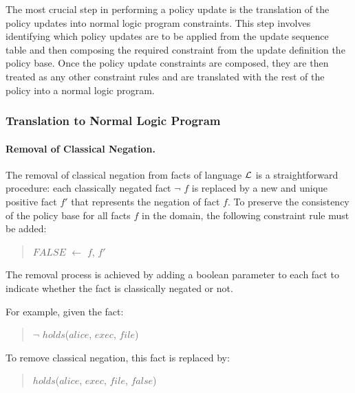\documentclass[10pt, twocolumn]{article}
\begin{document}
        The most crucial step in performing a policy update is the translation
        of the policy updates into normal logic program constraints. This step
        involves identifying which policy updates are to be applied from the
        update sequence table and then composing the required constraint from
        the update definition the policy base. Once the policy update
        constraints are composed, they are then treated as any other
        constraint rules and are translated with the rest of the policy into
        a normal logic program.

      \subsubsection{Translation to Normal Logic Program}

        \paragraph{Removal of Classical Negation.}

          The removal of classical negation from facts of language ${\cal L}$
          is a straightforward procedure: each classically negated fact
          $\lnot$ $f$ is replaced by a new and unique positive fact $f'$ that
          represents the negation of fact $f$. To preserve the consistency of
          the policy base for all facts $f$ in the domain, the following
          constraint rule must be added:

          \begin{quote}
            $FALSE$ $\leftarrow$ $f$, $f'$
          \end{quote}

          The removal process is achieved by adding a boolean parameter to
          each fact to indicate whether the fact is classically negated or
          not. 

          For example, given the fact:

          \begin{quote}
            $\lnot$ $holds$($alice$, $exec$, $file$)
          \end{quote}

          To remove classical negation, this fact is replaced by:

          \begin{quote}
            $holds$($alice$, $exec$, $file$, $false$)
          \end{quote}
\end{document}
